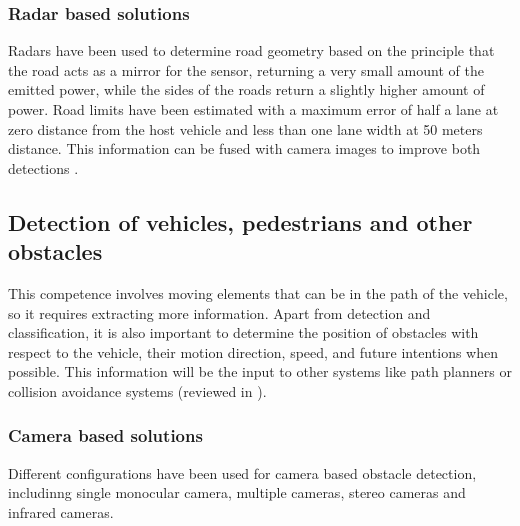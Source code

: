 
\subsubsection{Radar based solutions}
Radars have been used to determine road geometry based on the principle that the
road acts as a mirror for the sensor, returning a very small amount of the 
emitted power, while the sides of the roads return a slightly higher 
amount of power. Road limits have been estimated with a
maximum error of half a lane at zero distance from the host vehicle and less 
than one lane width at 50 meters distance. This information can be fused with
camera images to improve both detections 
\cite{kaliyaperumal2001algorithm, ma2000simultaneous, Janda2013}.

\subsection{Detection of vehicles, pedestrians and other obstacles}
This competence involves moving elements that can be in the path of the 
vehicle, so it requires extracting more information. Apart from detection and 
classification, it is also important to determine the position of obstacles 
with respect to the vehicle, their motion direction, speed, and 
future intentions when possible. 
This information will be the input to other systems like path planners 
or collision avoidance systems (reviewed in \cite{mukhtar2015vehicle}).

\subsubsection{Camera based solutions}
Different configurations have been used for camera based obstacle detection, 
includinng single monocular camera, multiple cameras, stereo cameras and 
infrared cameras.

